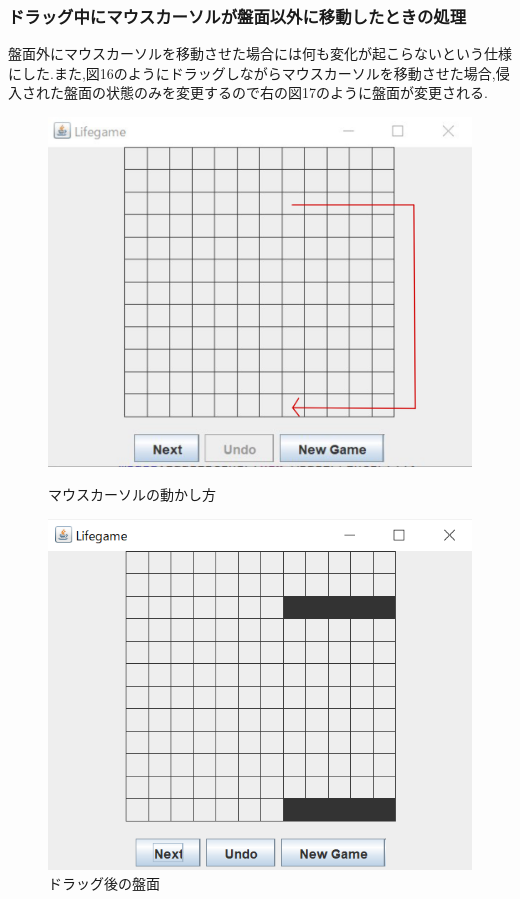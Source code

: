 \documentclass[dvipdfmx]{jarticle}
\begin{document}
\subsubsection{ドラッグ中にマウスカーソルが盤面以外に移動したときの処理}
盤面外にマウスカーソルを移動させた場合には何も変化が起こらないという仕様にした.また,図16のようにドラッグしながらマウスカーソルを移動させた場合,侵入された盤面の状態のみを変更するので右の図17のように盤面が変更される.
\begin{figure}[htbp]
  \begin{minipage}[b]{0.45\linewidth}
    \centering
    \includegraphics[keepaspectratio, scale=0.1]{tegaki.png}
    \caption{マウスカーソルの動かし方}
  \end{minipage}
  \begin{minipage}[b]{0.45\linewidth}
    \centering
    \includegraphics[keepaspectratio, scale=0.4]{after_drag.png}
    \caption{ドラッグ後の盤面}
  \end{minipage}
\end{figure}
\end{document}
